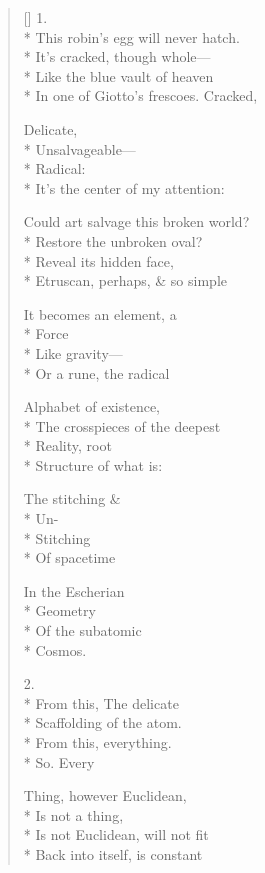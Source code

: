 \label{ch:the_second_law}
\settowidth{\versewidth}{                              Is this cause}
\begin{verse}[\versewidth]
1.\\*
This robin's egg will never hatch.\\*
It's cracked, though whole--- \\*
Like the blue vault of heaven\\*
In one of Giotto's frescoes.   Cracked,

Delicate,\\*
Unsalvageable---\\*
Radical:\\*
It's the center of my attention:

Could art salvage this broken world?\\*
Restore the unbroken oval?\\*
Reveal its hidden face,\\*
Etruscan, perhaps, \& so simple

It becomes an element, a\\*
Force\\*
Like gravity--- \\*
Or a rune, the radical

Alphabet of existence,\\*
The crosspieces of the deepest\\*
Reality, root\\*
Structure of what is:

The stitching \&\\*
Un-\\*
Stitching\\*
Of spacetime

In the Escherian \\*
Geometry\\*
Of the subatomic\\*
Cosmos.

2.\\*
 From this,
The delicate\\*
Scaffolding of the atom.\\*
From this, everything.\\*
So. \qquad Every

Thing, however Euclidean,\\*
Is not a thing,\\*
Is not Euclidean, will not fit\\*
Back into itself, is constant


\end{verse}
